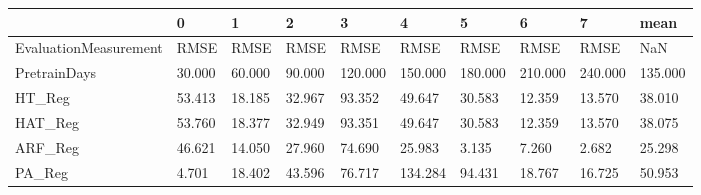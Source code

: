 \begin{tabular}{llllllllll}
\toprule
{} &      0 &      1 &      2 &       3 &       4 &       5 &       6 &       7 &    mean \\
\midrule
EvaluationMeasurement &   RMSE &   RMSE &   RMSE &    RMSE &    RMSE &    RMSE &    RMSE &    RMSE &     NaN \\
PretrainDays          & 30.000 & 60.000 & 90.000 & 120.000 & 150.000 & 180.000 & 210.000 & 240.000 & 135.000 \\
HT\_Reg                & 53.413 & 18.185 & 32.967 &  93.352 &  49.647 &  30.583 &  12.359 &  13.570 &  38.010 \\
HAT\_Reg               & 53.760 & 18.377 & 32.949 &  93.351 &  49.647 &  30.583 &  12.359 &  13.570 &  38.075 \\
ARF\_Reg               & 46.621 & 14.050 & 27.960 &  74.690 &  25.983 &   3.135 &   7.260 &   2.682 &  25.298 \\
PA\_Reg                &  4.701 & 18.402 & 43.596 &  76.717 & 134.284 &  94.431 &  18.767 &  16.725 &  50.953 \\
\bottomrule
\end{tabular}
